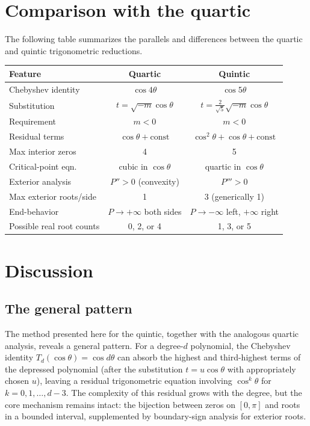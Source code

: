 \documentclass[12pt]{article}
\theoremstyle{definition}
\theoremstyle{remark}
\begin{document}
\section{Comparison with the quartic}

The following table summarizes the parallels and differences between the quartic and quintic trigonometric reductions.

\medskip

\begin{center}
\renewcommand{\arraystretch}{1.3}
\begin{tabular}{lcc}
\hline
\textbf{Feature} & \textbf{Quartic} & \textbf{Quintic} \\
\hline
Chebyshev identity & $\cos 4\theta$ & $\cos 5\theta$ \\
Substitution & $t = \sqrt{-m}\cos\theta$ & $t = \tfrac{2}{\sqrt{5}}\sqrt{-m}\cos\theta$ \\
Requirement & $m < 0$ & $m < 0$ \\
Residual terms & $\cos\theta + \text{const}$ & $\cos^2\!\theta + \cos\theta + \text{const}$ \\
Max interior zeros & 4 & 5 \\
Critical-point eqn. & cubic in $\cos\theta$ & quartic in $\cos\theta$ \\
Exterior analysis & $P'' > 0$ (convexity) & $P''' > 0$ \\
Max exterior roots/side & 1 & 3 (generically 1) \\
End-behavior & $P \to +\infty$ both sides & $P \to -\infty$ left, $+\infty$ right \\
Possible real root counts & 0, 2, or 4 & 1, 3, or 5 \\
\hline
\end{tabular}
\end{center}

\section{Discussion}

\subsection{The general pattern}

The method presented here for the quintic, together with the analogous quartic analysis, reveals a general pattern. For a degree-$d$ polynomial, the Chebyshev identity $T_d(\cos\theta) = \cos d\theta$ can absorb the highest and third-highest terms of the depressed polynomial (after the substitution $t = u\cos\theta$ with appropriately chosen $u$), leaving a residual trigonometric equation involving $\cos^k\!\theta$ for $k = 0, 1, \ldots, d-3$. The complexity of this residual grows with the degree, but the core mechanism remains intact: the bijection between zeros on $[0,\pi]$ and roots in a bounded interval, supplemented by boundary-sign analysis for exterior roots.
\end{document}
